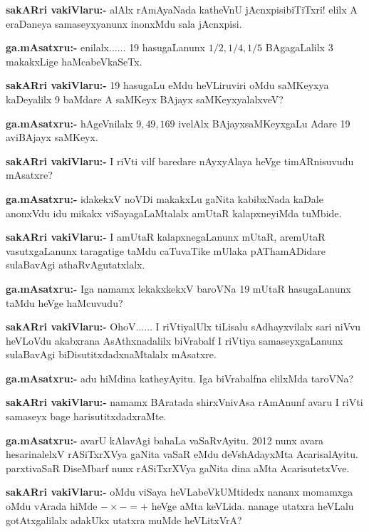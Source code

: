 \smallskip
\noindent
\textbf{sakARri vakiVlaru:-} alAlx rAmAyaNada katheVnU jAcnxpisibiTiTxri! elilx A eraDaneya samaseyxyanunx inonxMdu sala jAcnxpisi.

\smallskip
\noindent
\textbf{ga.mAsatxru:-} enilalx$\ldots\ldots$ {\rm 19} hasugaLanunx $1/2, 1/4, 1/5$ BAgagaLalilx {\rm 3} makakxLige haMcabeVkaSeTx.

\smallskip
\noindent
\textbf{sakARri vakiVlaru:-} {\rm 19} hasugaLu eMdu heVLiruviri oMdu saMKeyxya kaDeyalilx {\rm 9} baMdare A saMKeyx BAjayx saMKeyxyalalxveV?

\smallskip
\noindent
\textbf{ga.mAsatxru:-} hAgeVnilalx $9, 49, 169$ ivelAlx BAjayxsaMKeyxgaLu Adare {\rm 19} aviBAjayx saMKeyx.

\smallskip
\noindent
\textbf{sakARri vakiVlaru:-} I riVti vilf baredare nAyxyAlaya heVge timARnisuvudu mAsatxre?

\smallskip
\noindent
\textbf{ga.mAsatxru:-} idakekxV noVDi makakxLu gaNita kabibxNada kaDale anonxVdu idu mikakx viSayagaLaMtalalx amUtaR kalapxneyiMda tuMbide.

\smallskip
\noindent
\textbf{sakARri vakiVlaru:-} I amUtaR kalapxnegaLanunx mUtaR, aremUtaR vasutxgaLanunx taragatige taMdu caTuvaTike mUlaka pAThamADidare sulaBavAgi athaRvAgutatxlalx.

\smallskip
\noindent
\textbf{ga.mAsatxru:-} Iga namamx lekakxkekxV baroVNa {\rm 19} mUtaR hasugaLanunx taMdu heVge haMcuvudu?

\smallskip
\noindent
\textbf{sakARri vakiVlaru:-} OhoV$\ldots\ldots$ I riVtiyalUlx tiLisalu sAdhayxvilalx sari niVvu heVLoVdu akabxrana AsAthxnadalilx biVrabalf I riVtiya samaseyxgaLanunx sulaBavAgi biDisutitxdadxnaMtalalx mAsatxre.

\smallskip
\noindent
\textbf{ga.mAsatxru:-} adu hiMdina katheyAyitu. Iga biVrabalfna elilxMda taroVNa?

\smallskip
\noindent
\textbf{sakARri vakiVlaru:-} namamx BAratada shirxVnivAsa rAmAnunf avaru I riVti samaseyx bage harisutitxdadxraMte.

\smallskip
\noindent
\textbf{ga.mAsatxru:-} avarU kAlavAgi bahaLa vaSaRvAyitu. {\rm 2012} nunx avara hesarinalelxV rASiTxrXVya gaNita vaSaR eMdu deVshAdayxMta AcarisalAyitu. parxtivaSaR DiseMbarf nunx rASiTxrXVya gaNita dina aMta AcarisutetxVve.

\smallskip
\noindent
\textbf{sakARri vakiVlaru:-} oMdu viSaya heVLabeVkUMtidedx nananx momamxga oMdu vArada hiMde $-\times -=+$ heVge aMta keVLida. nanage utatxra heVLalu gotAtxgalilalx adakUkx utatxra muMde heVLitxVrA?

